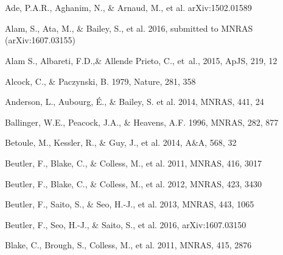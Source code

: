 \documentclass[iop]{emulateapj}
\begin{document}
\

\

\begin{thebibliography}{}

Ade, P.A.R., Aghanim, N., \& Arnaud, M., et al. arXiv:1502.01589

Alam, S., Ata, M., \& Bailey, S., et al. 2016,
submitted to MNRAS (arXiv:1607.03155)

{Alam} S., Albareti, F.D.,\& Allende Prieto, C., {et~al.}, 2015,  ApJS, 219, 12

Alcock, C., \& Paczynski, B. 1979, Nature, 281, 358  


Anderson, L., Aubourg, \'E., \& Bailey, S. et al. 2014, MNRAS, 441, 24  
  

Ballinger, W.E., Peacock, J.A., \& Heavens, A.F. 1996, MNRAS, 282, 877  

Betoule, M., Kessler, R., \& Guy, J., et al. 2014, A\&A, 568, 32



Beutler, F., Blake, C., \& Colless, M., et al. 2011, MNRAS, 416, 3017

Beutler, F., Blake, C., \& Colless, M., et al. 
2012, MNRAS, 423, 3430

Beutler, F., Saito, S., \& Seo, H.-J., et al. 2013, MNRAS, 443, 1065

Beutler, F., Seo, H.-J., \& Saito, S., et al. 2016,
arXiv:1607.03150

Blake, C., Brough, S., Colless, M., et al.
2011, MNRAS, 415, 2876


\end{thebibliography}
\end{document}
